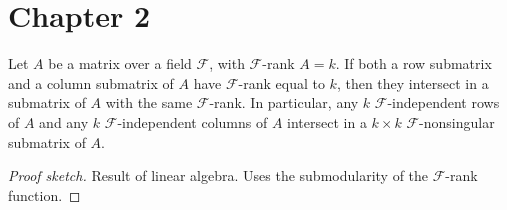 \section{Chapter 2}

\begin{lemma}[2.3.14]
  \label{lem:2.3.14}
  Let $A$ be a matrix over a field $\mathcal{F}$, with $\mathcal{F}$-rank $A = k$. If both a row submatrix and a column submatrix of $A$ have $\mathcal{F}$-rank equal to $k$, then they intersect in a submatrix of $A$ with the same $\mathcal{F}$-rank. In particular, any $k$ $\mathcal{F}$-independent rows of $A$ and any $k$ $\mathcal{F}$-independent columns of $A$ intersect in a $k \times k$ $\mathcal{F}$-nonsingular submatrix of $A$.
\end{lemma}

\begin{proof}[Proof sketch]
  Result of linear algebra. Uses the submodularity of the $\mathcal{F}$-rank function.
\end{proof}
